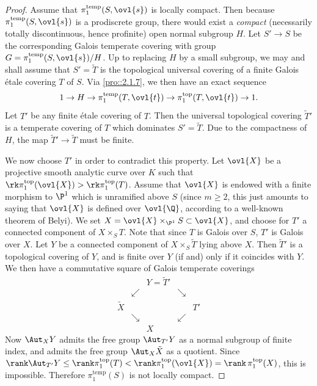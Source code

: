 \begin{proof}
 Assume that $\pi_1^{\mathrm{temp}}(S,\ovl{s}) $ is
 locally compact. Then because $\pi_1^{\mathrm{temp}}(S,\ovl{s})$ is a
 prodiscrete group, there would exist a {\it compact} (necessarily
 totally discontinuous, hence profinite) open normal subgroup $H$. Let
 $S'\to S$ be the corresponding Galois temperate covering with group
 $G=\pi_1^{\mathrm{temp}}(S,\ovl{s})/H$. Up to replacing $H$ by a small
 subgroup, we may and shall assume that $S'=\tilde T$ is the topological
 universal covering of a finite Galois \'etale covering $T$ of $S$. Via
 \ref{pro::2.1.7}, we then have an exact sequence
 \begin{equation*}
 1\to H\to \pi_1^{\mathrm{temp}}(T,\ovl{t})\to \pi_1^{\mathrm{top}}(T,
 \ovl{t} )\to 1. 
 \end{equation*}
 Let $T'$ be any finite \'etale covering of $T$. Then the universal
 topological covering $\tilde T'$ is a temperate covering of $T$ which
 dominates $S'=\tilde T$. Due to the compactness of $H$, the map $\tilde 
 T' \to \tilde T$ must be finite. 

 We now choose $T'$ in order to contradict this property. Let $\ovl{X}$
 be a projective smooth analytic curve over $K$ such that $\rk
 \pi_1^{\mathrm{top}}(\ovl{X}) > \rk \pi_1^{\mathrm{top}}(T)$. Assume
 that $\ovl{X}$ is endowed with a finite morphism to $\P^1$ which is
 unramified above $S$ (since $m\geq 2$, this just amounts to saying that
 $\ovl{X}$ is defined over $\ovl{\Q}$, according to a well-known theorem
 of Belyi). We set $X=\ovl{X}\times_{\P^1} S \subset \ovl{X}$, and choose
 for $T'$ a connected component of $ X\times_S T$. Note that since $T$ is
 Galois over $S$, $T'$ is Galois over $X$. Let $Y$ be a connected
 component of $X\times_S \tilde T$ lying above $X$. Then $\tilde T' $ is
 a topological covering of $Y$, and is finite over $Y$ (if and) only if 
 it coincides with $Y$.  We then have a commutative square of Galois 
 temperate coverings
 \begin{equation*}
  \begin{matrix}
   && Y = \tilde T'&&\\
   &\swarrow &&\searrow &\\
   \tilde X &&&& T' \\
   &\searrow &&
   \swarrow &\\
   &&X&&
  \end{matrix}
 \end{equation*}
 Now $\Aut_X Y$ admits the free group $\Aut_{T'} Y$ as a normal subgroup
 of finite index, and admits the free group $\Aut_X \tilde X$ as a
 quotient. Since $\rank \Aut_{T'} Y \leq \rank \pi_1^{\mathrm{top}}(T)<
 \rank \pi_1^{\mathrm{top}}(\ovl{X})=\rank\,\pi_1^{\mathrm{top}}(X)$, this is
 impossible. Therefore $\pi_1^{\mathrm{temp}}(S) $ is not locally compact.  
\end{proof}

